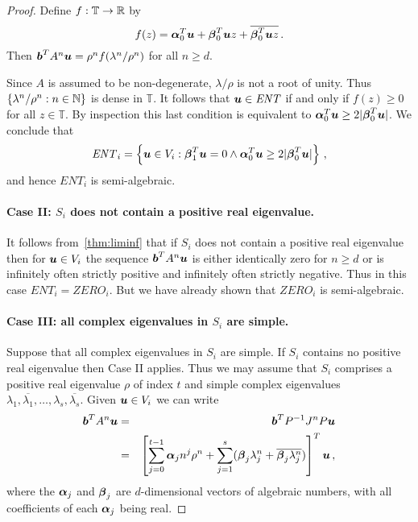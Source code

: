 \begin{proof}
Define $f:\mathbb{T}\rightarrow\mathbb{R}$ by
\[ f(z)=\boldsymbol{\alpha}_0^T\boldsymbol{u}+
\boldsymbol{\beta}_0^T\boldsymbol{u}z+
\overline{\boldsymbol{\beta}_0^T\boldsymbol{u}z} \, .\]
Then $\boldsymbol{b}^TA^n\boldsymbol{u} = \rho^n f(\lambda^n/\rho^n)$ for all $n\geq d$.

Since $A$ is assumed to be non-degenerate, $\lambda/\rho$ is not a
root of unity.  Thus $\lbrace \lambda^n/\rho^n:n\in\mathbb{N}\rbrace$ is dense in
$\mathbb{T}$.  It follows that $\boldsymbol{u}\in\mathit{ENT}$ if and
only if $f(z)\geq 0$ for all $z\in\mathbb{T}$.  By inspection this
last condition is equivalent to $\boldsymbol{\alpha}_0^T\boldsymbol{u}
\geq 2|\boldsymbol{\beta}_0^T\boldsymbol{u}|$.
We conclude that
\[ \mathit{ENT}_i = \left\lbrace \boldsymbol{u}\in V_i :
\boldsymbol{\beta}_1^T\boldsymbol{u}=0 \wedge
\boldsymbol{\alpha}_0^T\boldsymbol{u} \geq 2|\boldsymbol{\beta}_0^T\boldsymbol{u}| \right\rbrace \, ,\]
and hence $\mathit{ENT}_i$ is semi-algebraic.

\paragraph{Case II: $S_i$ does not contain a positive real eigenvalue.}
It follows from~\cref{thm:liminf} that if $S_i$ does not contain a
positive real eigenvalue then for $\boldsymbol{u}\in V_i$ the sequence
$\boldsymbol{b}^TA^n\boldsymbol{u}$ is either identically zero for $n\geq
d$ or is infinitely often strictly positive and infinitely often
strictly negative.  Thus in this case
$\mathit{ENT}_i=\mathit{ZERO}_i$.  But we have already shown that
$\mathit{ZERO}_i$ is semi-algebraic.


\paragraph{Case III: all complex eigenvalues in $S_i$ are simple.}
Suppose that all complex eigenvalues in $S_i$ are simple.  If $S_i$
contains no positive real eigenvalue then Case II applies.  Thus we
may assume that $S_i$ comprises a positive real eigenvalue $\rho$ of
index $t$ and simple complex eigenvalues
$\lambda_1,\overline{\lambda_1},\ldots,\lambda_s,\overline{\lambda_s}$.
Given $\boldsymbol{u}\in V_i$ we can write
\begin{eqnarray}
\myvector{b}^TA^n\myvector{u} &=& \myvector{b}^TP^{-1}J^nP\myvector{u}
\notag\\
&=& \left[\sum_{j=0}^{t-1} \myvector{\alpha}_j n^j \rho^n + \sum_{j=1}^s
(\myvector{\beta}_j \lambda_j^n + \overline{\myvector{\beta}_j \lambda^n_j})
\right]^T\myvector{u} \, ,
\label{eq:exp-poly}
\end{eqnarray}
where the $\boldsymbol{\alpha}_j$ and $\boldsymbol{\beta}_j$ are
$d$-dimensional vectors of algebraic numbers, with all coefficients of
each $\boldsymbol{\alpha}_j$ being real.


\end{proof}
